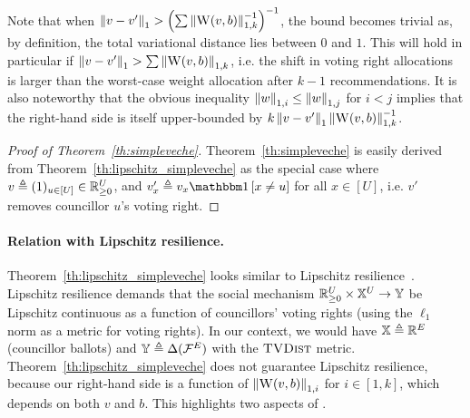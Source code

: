 Note that when 
$\left\lVert{v - v'}\right\rVert_{1} > \left( \sum \left\lVert{\textsc{W}(v, b)}\right\rVert_{1, k}^{-1} \right)^{-1}$,
the bound becomes trivial as,
by definition, the total variational distance lies between $0$ and $1$.
This will hold in particular if 
$\left\lVert{v - v'}\right\rVert_{1} > \sum \left\lVert{\textsc{W}(v, b)}\right\rVert_{1, k}$,
i.e. the shift in voting right allocations is larger 
than the worst-case weight allocation after $k-1$ recommendations.
It is also noteworthy that the obvious inequality
$\left\lVert{w}\right\rVert_{1,i} \leq \left\lVert{w}\right\rVert_{1,j}$ for $i < j$
implies that the right-hand side is itself upper-bounded by
$k \left\lVert{v - v'}\right\rVert_{1} \left\lVert{\textsc{W}(v, b)}\right\rVert_{1,k}^{-1}$.

\begin{proof}[Proof of Theorem~\ref{th:simpleveche}]
Theorem~\ref{th:simpleveche} is easily derived 
from Theorem~\ref{th:lipschitz_simpleveche} as the special case
where $v \triangleq (1)_{u \in [U]} \in \mathbb R_{\geq 0}^U$,
and $v'_{x} \triangleq v_x \indicator{x \neq u}$ for all $x \in [U]$,
i.e. $v'$ removes councillor $u$'s voting right.
\end{proof}






\paragraph{Relation with Lipschitz resilience.}
Theorem~\ref{th:lipschitz_simpleveche} looks similar 
to Lipschitz resilience~\cite{DBLP:conf/aistats/AllouahGHV24}.
Lipschitz resilience demands that 
the social mechanism $\mathbb R_{\geq 0}^U \times \mathbb X^U \to \mathbb Y$ 
be Lipschitz continuous as a function of councillors' voting rights
(using the $\ell_1$ norm as a metric for voting rights).
In our context, we would have $\mathbb X \triangleq \mathbb R^E$ (councillor ballots)
and $\mathbb Y \triangleq \Delta(\mathcal F^E)$ with the $\textsc{TVDist}$ metric.
Theorem~\ref{th:lipschitz_simpleveche} does not guarantee Lipschitz resilience,
because our right-hand side is a function of $\left\lVert{\textsc{W}(v, b)}\right\rVert_{1,i}$
for $i \in [1, k]$,
which depends on both $v$ and $b$.
This highlights two aspects of \SimpleVeche{}.

